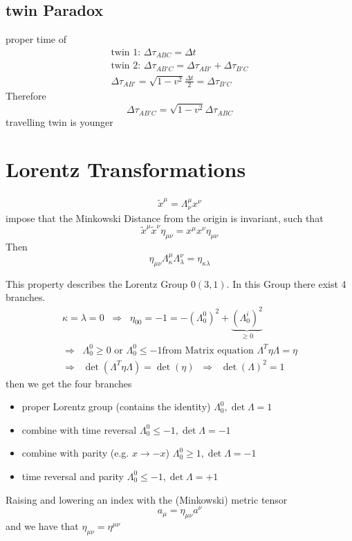\subsection{twin Paradox} 
proper time of
\begin{gather}
	\text{twin 1: } \Delta \tau_{ABC} = \Delta t\\
	\text{twin 2: } \Delta\tau_{AB'C} = \Delta\tau_{AB'} + \Delta\tau_{B'C}\\
	\Delta\tau_{AB'} = \sqrt{1-v^2} \frac{\Delta t}{2} = \Delta\tau_{B'C}
\end{gather}
Therefore
\begin{equation}
	\Delta\tau_{AB'C} = \sqrt{1-v^2}\Delta\tau_{ABC}
\end{equation}
travelling twin is younger


\section{Lorentz Transformations}

\begin{gather}
	\tilde x^\mu = \Lambda^\mu_\nu x^\nu
\end{gather}
impose that the Minkowski Distance from the origin is invariant, such that
\begin{equation}
	\tilde x^\mu \tilde x^\nu \eta_{\mu\nu} = x^\mu x^\nu \eta_{\mu\nu}
\end{equation}
Then
\begin{equation}
	\eta_{\mu\nu} \Lambda^\mu_\kappa \Lambda^\nu_\lambda = \eta_{\kappa\lambda}
\end{equation}

This property describes the Lorentz Group $0(3,1)$. In this Group there exist 4 branches.
\begin{gather}
	\kappa=\lambda=0\;\;\Rightarrow\;\; \eta_{00} = -1 = -(\Lambda^0_0)^2 + \underbrace{(\Lambda^i_0)^2}_{\geq 0}\\
	\Rightarrow\;\; \Lambda^0_0 \geq 0 \text{ or } \Lambda^0_0 \leq -1
	\text{from Matrix equation } \Lambda^T \eta \Lambda = \eta\\
	\Rightarrow \;\; \det(\Lambda^T \eta\Lambda) = \det(\eta) \;\;\Rightarrow\;\; \det(\Lambda)^2 =1
\end{gather}
then we get the four branches
\begin{itemize}
	\item proper Lorentz group (contains the identity) $\Lambda^0_0,\det\Lambda = 1$
	\item combine with time reversal $\Lambda^0_0 \leq -1,\det\Lambda = -1$
	\item combine with parity (e.g. $x\rightarrow -x$) $\Lambda^0_0 \geq 1,\det\Lambda = -1$
	\item time reversal and parity $\Lambda^0_0 \leq -1,\det\Lambda = +1$
\end{itemize}
Raising and lowering an index with the (Minkowski) metric tensor
\begin{equation}
	a_\mu = \eta_{\mu\nu} a^\nu
\end{equation}
and we have that $\eta_{\mu\nu} = \eta^{\mu\nu}$


